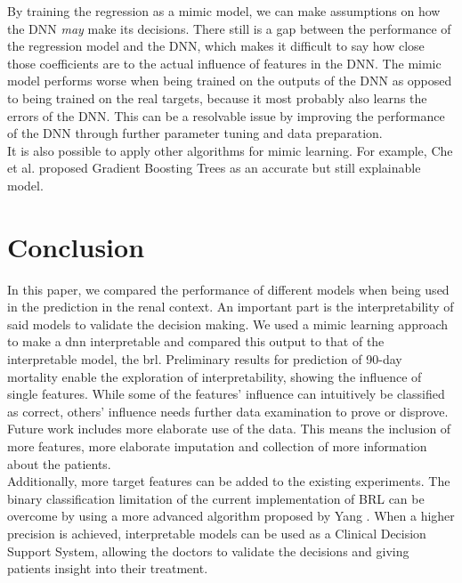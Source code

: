 \documentclass[conference,comsoc]{IEEEtran}
\begin{document}
By training the regression as a mimic model, we can make assumptions on how the DNN \emph{may} make its decisions.
There still is a gap between the performance of the regression model and the DNN, which makes it difficult to say how close those coefficients are to the actual influence of features in the DNN.
The mimic model performs worse when being trained on the outputs of the DNN as opposed to being trained on the real targets, because it most probably also learns the errors of the DNN.
This can be a resolvable issue by improving the performance of the DNN through further parameter tuning and data preparation. \\
It is also possible to apply other algorithms for mimic learning.
For example, Che et al. \cite{Che2016} proposed Gradient Boosting Trees as an accurate but still explainable model.


\section{Conclusion}
In this paper, we compared the performance of different models when being used in the prediction in the renal context.
An important part is the interpretability of said models to validate the decision making.
We used a mimic learning approach to make a \gls{dnn} interpretable and compared this output to that of the interpretable model, the \gls{brl}.
Preliminary results for prediction of 90-day mortality enable the exploration of interpretability, showing the influence of single features.
While some of the features' influence can intuitively be classified as correct, others' influence needs further data examination to prove or disprove. \\

Future work includes more elaborate use of the data. 
This means the inclusion of more features, more elaborate imputation and collection of more information about the patients. \\
Additionally, more target features can be added to the existing experiments. 
The binary classification limitation of the current implementation of BRL can be overcome by using a more advanced algorithm proposed by Yang \cite{Yang2016}.
When a higher precision is achieved, interpretable models can be used as a Clinical Decision Support System, allowing the doctors to validate the decisions and giving patients insight into their treatment.




\onecolumn
\end{document}
